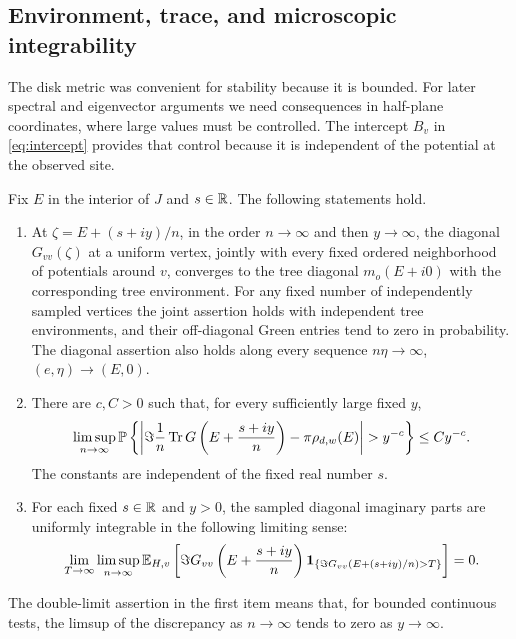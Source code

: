 \subsection{Environment, trace, and microscopic integrability}

The disk metric was convenient for stability because it is bounded.
For later spectral and eigenvector arguments we need consequences in
half-plane coordinates, where large values must be controlled.  The
intercept $B_v$ in \eqref{eq:intercept} provides that control because
it is independent of the potential at the observed site.

\begin{corollary}
\label{cor:local-consequences}
Fix $E$ in the interior of $J$ and $s\in\mathbb R$.  The following statements
hold.
\begin{enumerate}
\item At $\zeta=E+(s+iy)/n$, in the order $n\to\infty$ and then
$y\to\infty$, the diagonal $G_{vv}(\zeta)$ at a uniform vertex,
jointly with every fixed ordered neighborhood of potentials around
$v$, converges to the tree diagonal $m_o(E+i0)$ with the corresponding
tree environment.  For any fixed number of independently sampled
vertices the joint assertion holds with independent tree environments,
and their off-diagonal Green entries tend to zero in probability.
The diagonal assertion also holds along every sequence
$n\eta\to\infty$, $(e,\eta)\to(E,0)$.
\item There are $c,C>0$ such that, for every sufficiently large fixed $y$,
\begin{equation}\label{eq:trace-slow-power}
 \limsup_{n\to\infty}\PP\left\{
 \left|\Im\frac1n\Tr G\left(E+\frac{s+iy}{n}\right)
             -\pi\rho_{d,w}(E)\right|>y^{-c}\right\}\le Cy^{-c}.
\end{equation}
The constants are independent of the fixed real number $s$.
\item For each fixed $s\in\mathbb R$ and $y>0$, the sampled diagonal imaginary
parts are uniformly integrable in the following limiting sense:
\begin{equation}\label{eq:microscopic-ui}
 \lim_{T\to\infty}\limsup_{n\to\infty}
 \mathbb E_{H,v}\left[
 \Im G_{vv}\left(E+\frac{s+iy}{n}\right)
 \mathbf1_{\{\Im G_{vv}(E+(s+iy)/n)>T\}}\right]=0.
\end{equation}
\end{enumerate}
The double-limit assertion in the first item means that, for bounded
continuous tests, the limsup of the discrepancy as $n\to\infty$
tends to zero as $y\to\infty$.
\end{corollary}

